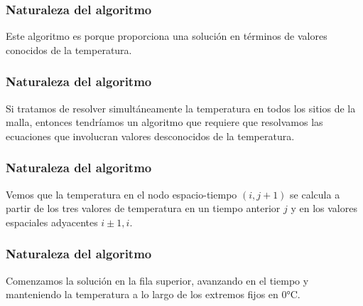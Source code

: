 \documentclass[12pt]{beamer}
\begin{document}
\begin{frame}
\frametitle{Naturaleza del algoritmo}
Este algoritmo es  porque proporciona una solución en términos de valores conocidos de la temperatura.
\end{frame}
\begin{frame}
\frametitle{Naturaleza del algoritmo}
Si tratamos de resolver simultáneamente la temperatura en todos los sitios de la malla, entonces tendríamos un algoritmo  que requiere que resolvamos las ecuaciones que involucran valores desconocidos de la temperatura.
\end{frame}
\begin{frame}
\frametitle{Naturaleza del algoritmo}
Vemos que la temperatura en el nodo espacio-tiempo $(i, j+1)$ se calcula a partir de los tres valores de temperatura en un tiempo anterior $j$ y en los valores espaciales adyacentes $i \pm 1, i$.
\end{frame}
\begin{frame}
\frametitle{Naturaleza del algoritmo}
Comenzamos la solución en la fila superior, avanzando en el tiempo y manteniendo la temperatura a lo largo de los extremos fijos en $0 \si\celsius$.
\end{frame}
\end{document}
